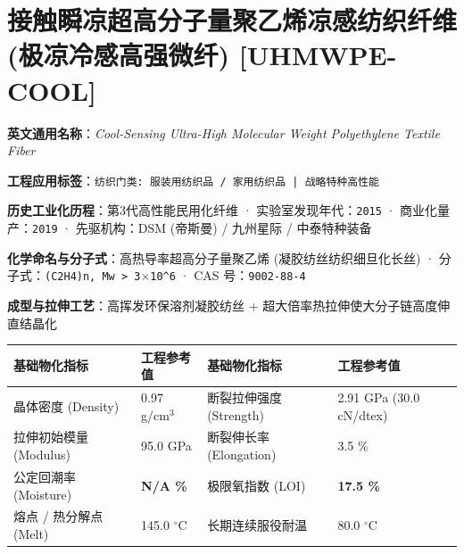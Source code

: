 \documentclass[11pt,openright,twoside,UTF8]{ctexbook}
\begin{document}
\section{接触瞬凉超高分子量聚乙烯凉感纺织纤维 (极凉冷感高强微纤) [UHMWPE-COOL]}
\label{sec:uhmwpe-cool}

\noindent\textbf{英文通用名称}：\textit{Cool-Sensing Ultra-High Molecular Weight Polyethylene Textile Fiber}\par
\noindent\textbf{工程应用标签}：\texttt{纺织门类: 服装用纺织品 / 家用纺织品 | 战略特种高性能}\par
\noindent\textbf{历史工业化历程}：第3代高性能民用化纤维 · 实验室发现年代：\texttt{2015} · 商业化量产：\texttt{2019} · 先驱机构：DSM (帝斯曼) / 九州星际 / 中泰特种装备\par
\noindent\textbf{化学命名与分子式}：高热导率超高分子量聚乙烯 (凝胶纺丝纺织细旦化长丝) · 分子式：\texttt{(C2H4)n, Mw \textgreater{} 3$\times$10\textasciicircum{}6} · CAS 号：\texttt{9002-88-4}\par
\noindent\textbf{成型与拉伸工艺}：高挥发环保溶剂凝胶纺丝 + 超大倍率热拉伸使大分子链高度伸直结晶化\par

\vspace{0.15cm}
\begin{center}
\small
\begin{tabularx}{\textwidth}{p{3.8cm}Xp{3.8cm}X}
\toprule
\textbf{基础物化指标} & \textbf{工程参考值} & \textbf{基础物化指标} & \textbf{工程参考值} \\
\midrule
晶体密度 (Density) & 0.97 g/cm$^3$ & 断裂拉伸强度 (Strength) & 2.91 GPa (30.0 cN/dtex) \\
拉伸初始模量 (Modulus) & 95.0 GPa & 断裂伸长率 (Elongation) & 3.5 \% \\
公定回潮率 (Moisture) & \textbf{N/A \%} & 极限氧指数 (LOI) & \textbf{17.5 \%} \\
熔点 / 热分解点 (Melt) & 145.0 $^\circ\mathrm{C}$ & 长期连续服役耐温 & 80.0 $^\circ\mathrm{C}$ \\
\bottomrule
\end{tabularx}
\end{center}
\vspace{0.15cm}
\end{document}
